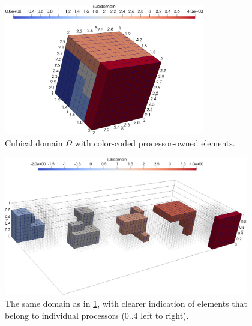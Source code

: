 \begin{figure}[H]
		\begin{center}
			\includegraphics[width=0.78\textwidth]{img/mesh/cube.jpg}
			\vspace{-2mm}
		\caption{Cubical domain $\Omega$ with color-coded processor-owned elements.}
		\label{figure:domainDecomposition}
		\end{center}
	\end{figure}\vspace{-5mm}
	
\begin{figure}[H]
		\begin{center}
			\includegraphics[width=0.95\textwidth]{img/mesh/cubeSub.jpg}
			\vspace{-2mm}
		\caption{The same domain as in \cref{figure:domainDecomposition}, with clearer indication of elements that belong to individual processors (0..4 left to right).}
		\label{figure:domainDecomposition2}
		\end{center}
	\end{figure}\vspace{-5mm}
	